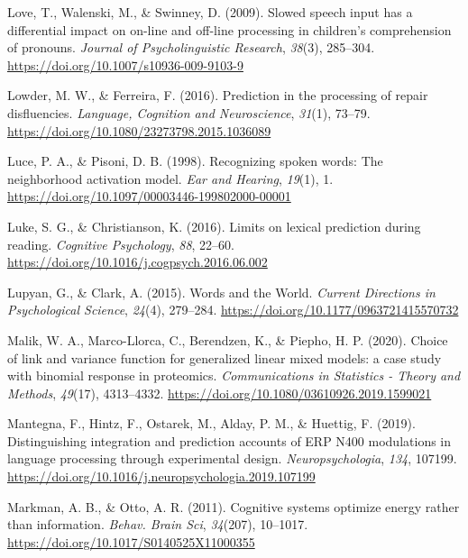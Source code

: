 \documentclass[a4paper, nobind]{templates/ociamthesis}
\newlength{\cslhangindent}
\newenvironment{CSLReferences}[2] %
 {%
  \setlength{\parindent}{0pt}
  \ifodd #1
  \let\oldpar\par
  \def\par{\hangindent=\cslhangindent\oldpar}
  \fi
  \setlength{\parskip}{1mm}
  \setlength{\baselineskip}{6mm}
 }%
 {}
\begin{document}
\begin{CSLReferences}{1}{0}
\leavevmode{}%
Love, T., Walenski, M., \& Swinney, D. (2009). {Slowed speech input has a differential impact on on-line and off-line processing in children's comprehension of pronouns}. \emph{Journal of Psycholinguistic Research}, \emph{38}(3), 285--304. \url{https://doi.org/10.1007/s10936-009-9103-9}

\leavevmode{}%
Lowder, M. W., \& Ferreira, F. (2016). {Prediction in the processing of repair disfluencies}. \emph{Language, Cognition and Neuroscience}, \emph{31}(1), 73--79. \url{https://doi.org/10.1080/23273798.2015.1036089}

\leavevmode{}%
Luce, P. A., \& Pisoni, D. B. (1998). Recognizing spoken words: The neighborhood activation model. \emph{Ear and Hearing}, \emph{19}(1), 1. \url{https://doi.org/10.1097/00003446-199802000-00001}

\leavevmode{}%
Luke, S. G., \& Christianson, K. (2016). Limits on lexical prediction during reading. \emph{Cognitive Psychology}, \emph{88}, 22--60. \url{https://doi.org/10.1016/j.cogpsych.2016.06.002}

\leavevmode{}%
Lupyan, G., \& Clark, A. (2015). Words and the World. \emph{Current Directions in Psychological Science}, \emph{24}(4), 279--284. \url{https://doi.org/10.1177/0963721415570732}

\leavevmode{}%
Malik, W. A., Marco-Llorca, C., Berendzen, K., \& Piepho, H. P. (2020). {Choice of link and variance function for generalized linear mixed models: a case study with binomial response in proteomics}. \emph{Communications in Statistics - Theory and Methods}, \emph{49}(17), 4313--4332. \url{https://doi.org/10.1080/03610926.2019.1599021}

\leavevmode{}%
Mantegna, F., Hintz, F., Ostarek, M., Alday, P. M., \& Huettig, F. (2019). Distinguishing integration and prediction accounts of ERP N400 modulations in language processing through experimental design. \emph{Neuropsychologia}, \emph{134}, 107199. \url{https://doi.org/10.1016/j.neuropsychologia.2019.107199}

\leavevmode{}%
Markman, A. B., \& Otto, A. R. (2011). Cognitive systems optimize energy rather than information. \emph{Behav. Brain Sci}, \emph{34}(207), 10--1017. \url{https://doi.org/10.1017/S0140525X11000355}


\end{CSLReferences}
\end{document}
